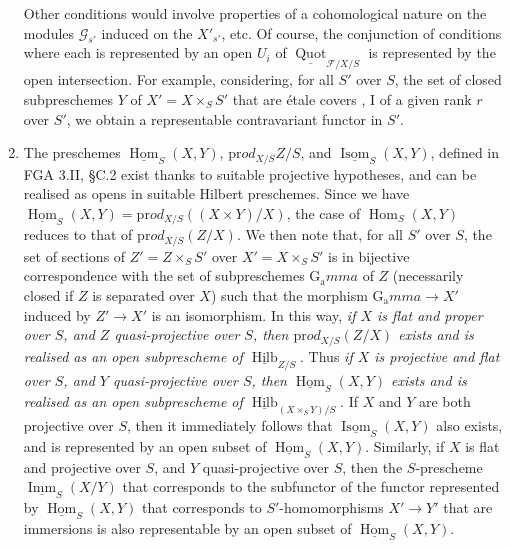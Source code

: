 \begin{enumerate}[label=\alph*.]
\begin{enumerate}
        \end{enumerate}
        Other conditions would involve properties of a cohomological nature on the modules $\mathcal{G}_{s'}$ induced on the $X'_{s'}$, etc.
        Of course, the conjunction of conditions where each is represented by an open $U_i$ of $\underline{\operatorname{Quot}}_{\mathcal{F}/X/S}$ is represented by the open intersection.
        For example, considering, for all $S'$ over $S$, the set of closed subpreschemes $Y$ of $X'=X\times_S S'$ that are étale covers \cite{Gro1960b}, I of a given rank $r$ over $S'$, we obtain a representable contravariant functor in $S'$.
  \item The preschemes $\underline{\operatorname{Hom}}_S(X,Y)$, $\mathrm{pr}od_{X/S}Z/S$, and $\underline{\operatorname{Isom}}_S(X,Y)$, defined in FGA 3.II, §C.2  exist thanks to suitable projective hypotheses, and can be realised as opens in suitable Hilbert preschemes.
        Since we have $\underline{\operatorname{Hom}}_S(X,Y)=\mathrm{pr}od_{X/S}((X\times Y)/X)$, the case of $\operatorname{Hom}_S(X,Y)$ reduces to that of $\mathrm{pr}od_{X/S}(Z/X)$.
        We then note that, for all $S'$ over $S$, the set of sections of $Z'=Z\times_S S'$ over $X'=X\times_S S'$ is in bijective correspondence with the set of subpreschemes $\operatorname{G_a}mma$ of $Z$ (necessarily closed if $Z$ is separated over $X$) such that the morphism $\operatorname{G_a}mma\to X'$ induced by $Z'\to X'$ is an isomorphism.
        In this way, \emph{if $X$ is flat and proper over $S$, and $Z$ quasi-projective over $S$, then $\mathrm{pr}od_{X/S}(Z/X)$ exists and is realised as an open subprescheme of $\underline{\operatorname{Hilb}}_{Z/S}$}.
        Thus \emph{if $X$ is projective and flat over $S$, and $Y$ quasi-projective over $S$, then $\underline{\operatorname{Hom}}_S(X,Y)$ exists and is realised as an open subprescheme of $\underline{\operatorname{Hilb}}_{(X\times_S Y)/S}$}.
        If $X$ and $Y$ are both projective over $S$, then it immediately follows that $\underline{\operatorname{Isom}}_S(X,Y)$ also exists, and is represented by an open subset of $\underline{\operatorname{Hom}}_S(X,Y)$.
        Similarly, if $X$ is flat and projective over $S$, and $Y$ quasi-projective over $S$, then the $S$-prescheme $\underline{\operatorname{Imm}}_S(X/Y)$ that corresponds to the subfunctor of the functor represented by $\underline{\operatorname{Hom}}_S(X,Y)$ that corresponds to $S'$-homomorphisms $X'\to Y'$ that are immersions is also representable by an open subset of $\underline{\operatorname{Hom}}_S(X,Y)$.


\end{enumerate}
